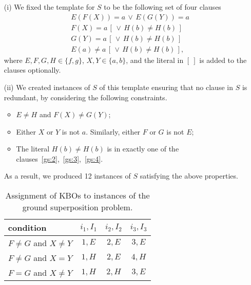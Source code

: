 \begin{itemize}
\item[(i)] We fixed the template for $S$ to be the following set of four clauses
\begin{align}
  &E(F(X)) = a \,\lor\, E(G(Y)) = a \label{gs:1} \\
  &F(X) = a \,[\, \lor\, H(b) \not= H(b) \,] \label{gs:2} \\
  &G(Y) = a \,[\, \lor\, H(b) \not= H(b) \,] \label{gs:3} \\
  &E(a) \not= a \,[\, \lor\, H(b) \not= H(b) \,] \label{gs:4},
\end{align}
where $E, F, G, H \in \{f, g\}$, $X, Y \in \{a, b\}$, and the literal
in $[~]$ is added to the clauses optionally.\\


\item[(ii)]
We created
instances of $S$ of this template ensuring that no clause in $S$ is
redundant, by considering the following constraints.
\begin{itemize}
  \item $E \not = H$ and $F(X) \not = G(Y)$;
  \item Either $X$ or $Y$ is not $a$. Similarly, either $F$ or $G$ is not $E$;
  \item The literal $H(b) \not = H(b)$ is in exactly one of the
    clauses~\eqref{gs:2},~\eqref{gs:3},~\eqref{gs:4}.
\end{itemize}
As a result, we produced 12 instances of $S$ satisfying the above properties.\\
%



\begin{table}[t]
\begin{center}
\begin{tabular}{l@{\hskip 1.05em} || c | c | c}
condition & $i_1, I_1$ & $i_2, I_2$ & $i_3, I_3$ \\ \hline
$F \not = G$ and $X \not= Y$ & $1,E$ & $2, E$ & $3, E$ \\
$F \not = G$ and $X = Y$ & $1, H$ & $2, E$ & $4, H$ \\
$F = G$ and $X \not= Y$ & $1, H$ & $2, H$ & $3, E$
\end{tabular}
\vspace*{0.4em}
\caption{Assignment of KBOs to instances of the ground superposition problem.}
\label{tab:ground-sup-as}
\end{center}
\end{table}


\end{itemize}
